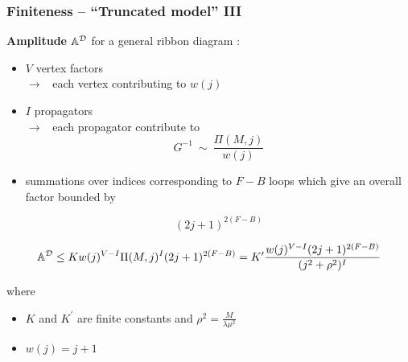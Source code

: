 \documentclass[9pt]{beamer}
\begin{document}

\begin{frame}

\frametitle{Finiteness -- ``Truncated model'' III}

\textbf{Amplitude} ${\mathbb{A}}^{\cal{D}}$ for a general ribbon diagram :

\begin{itemize}
\item $V$ vertex factors\\
$\to$ \ each vertex contributing to $w(j)$

\item $I$ propagators \\
$\to$ \ each propagator contribute to
%
\begin{equation*}
G^{-1} \ \sim \ \frac{\Pi(M,j)}{w(j)} 
\end{equation*}


\item summations over indices corresponding to $F-B$ loops which give an overall factor bounded by 

\begin{equation*}
(2j+1)^{2(F-B)} 
\end{equation*}

\end{itemize}

\begin{equation*}
{\mathbb{A}}^{\cal{D}}\le Kw(j)^{V-I}\Pi(M,j)^{I}(2j+1)^{2(F-B)}=K^\prime\frac{w(j)^{V-I}(2j+1)^{2(F-B)}}{(j^2+\rho^2)^I}
\end{equation*}

where 

\begin{itemize}
\item $K$ and $K^\prime$ are finite constants and $\rho^2=\frac{M}{\lambda\mu^2}$

\item $w(j)=j+1$ 

\end{itemize}

\end{frame}
\end{document}
